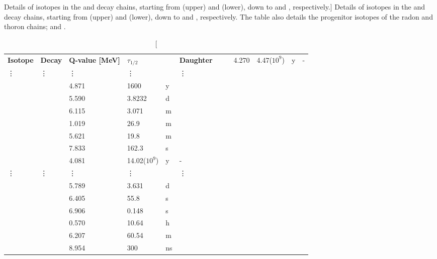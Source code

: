 \begin{table}[h]
\centering
\caption
[Details of isotopes in the \RnTTT{} and \RnTTZ{} decay chains, starting from \RaTTS{} (upper) and \RaTTF{} (lower), down to \PoTOF{} and \PoTOT{}, respectively.]
{Details of isotopes in the \RnTTT{} and \RnTTZ{} decay chains, starting from \RaTTS{} (upper) and \RaTTF{} (lower), down to \PoTOF{} and \PoTOT{}, respectively. The table also details the progenitor isotopes of the radon and thoron chains; \UTTE{} and \ThTTT{}.}
\label{tab:radon_decay_chains}
\vspace{1mm}
\renewcommand{\arraystretch}{1.2}
    \begin{tabularx}{1.0\textwidth}{@{\extracolsep{\fill}}llllll}
    \toprule
    
    \textbf{Isotope} & %
    \textbf{Decay} & %
    \textbf{Q-value [MeV]} & %
    \textbf{$\tau_{1/2}$} & %
    & %
    \textbf{Daughter} & %
    
    \hline
    \hline
    
    \UTTE{}	    & \alpha{}      & 4.270     & 4.47($10^{9}$)  & y     & - \\ 
    \vdots      & \vdots        & \vdots    & \vdots          &       & \vdots \\ 
    \RaTTS{}	& \alpha{}      & 4.871     & 1600            & y     & \RnTTT{} \\ 
    \RnTTT{}	& \alpha{}      & 5.590     & 3.8232          & d     & \PoTOE{} \\ 
    \PoTOE{}	& \alpha{}      & 6.115     & 3.071           & m     & \PbTOF{} \\
    \PbTOF{}	& \beta{}       & 1.019     & 26.9            & m     & \BiTOF{} \\
    \BiTOF{}	& \beta{}       & 5.621     & 19.8            & m     & \PoTOF{} \\
    \PoTOF{}	& \alpha{}      & 7.833     & 162.3           & \micro{}s  & \PbTOZ{} \\
    
    \hline
    \hline
    
    \ThTTT{}	& \alpha{}      & 4.081     & 14.02($10^{9}$)   & y     & - \\ 
    \vdots      & \vdots        & \vdots    & \vdots            &       & \vdots \\ 
    \RaTTF{}	& \alpha{}      & 5.789     & 3.631             & d     & \RnTTZ{} \\ 
    \RnTTZ{}	& \alpha{}      & 6.405     & 55.8              & s     & \PoTOS{} \\ 
    \PoTOS{}	& \alpha{}      & 6.906     & 0.148             & s     & \PbTOT{} \\
    \PbTOT{}	& \beta{}       & 0.570     & 10.64             & h     & \BiTOT{} \\
    \BiTOT{}	& \beta{}       & 6.207     & 60.54             & m     & \PoTOT{} \\
    \PoTOT{}	& \alpha{}      & 8.954     & 300               & ns    & \PbTZE{} \\
    
    \bottomrule
    \end{tabularx}
\end{table}

